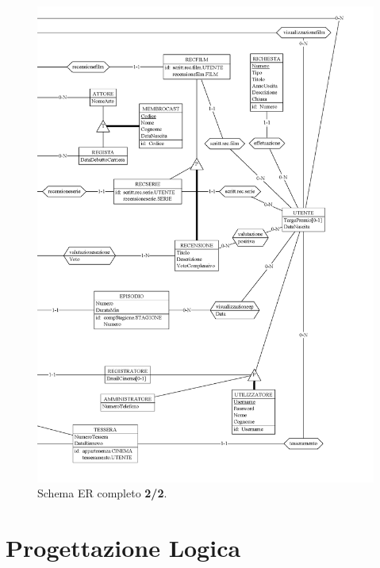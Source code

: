 \documentclass[a4paper,12pt]{report}
\begin{document}
	\begin{figure}[H]
		\centering
		\includegraphics[width=450pt]{ER/ercompletodx.png}
		\caption{Schema ER completo \textbf{2/2}.}
	\end{figure}
	\chapter{Progettazione Logica}
\end{document}
